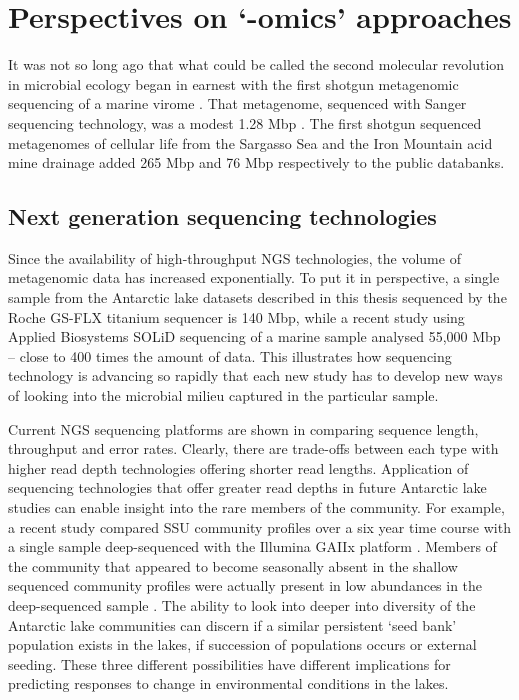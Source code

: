\section{Perspectives on `-omics' approaches }
It was not so long ago that what could be called the second molecular revolution in microbial ecology began in earnest with the first shotgun metagenomic sequencing of a marine virome \cite{Breitbart2002}.
That metagenome, sequenced with Sanger sequencing technology, was a modest 1.28 Mbp \cite{Breitbart2002}.
The first shotgun sequenced metagenomes of cellular life from the Sargasso Sea \cite{Venter2004} and the Iron Mountain acid mine drainage \cite{Tyson2004} added 265 Mbp and 76 Mbp respectively to the public databanks.

\subsection{Next generation sequencing technologies}
Since the availability of high-throughput \ac{NGS} technologies, the volume of metagenomic data has increased exponentially.
To put it in perspective, a single sample from the Antarctic lake datasets described in this thesis sequenced by the Roche GS-FLX titanium sequencer is 140 Mbp, while a recent study using Applied Biosystems SOLiD sequencing of a marine sample \cite{Iverson2012} analysed 55,000 Mbp -- close to 400 times the amount of data.
This illustrates how sequencing technology is advancing so rapidly that each new study has to develop new ways of looking into the microbial milieu captured in the particular sample.

Current \ac{NGS} sequencing platforms are shown in  comparing sequence length, throughput and error rates.
Clearly, there are trade-offs between each type with higher read depth technologies offering shorter read lengths. 
Application of sequencing technologies that offer greater read depths in future Antarctic lake studies can enable insight into the rare members of the community.
For example, a recent study compared \acs{SSU} community profiles over a six year time course with a single sample deep-sequenced with the Illumina GAIIx platform \cite{Caporaso2012}.
Members of the community that appeared to become seasonally absent in the shallow sequenced community profiles were actually present in low abundances in the deep-sequenced sample \cite{Caporaso2012}.
The ability to look into deeper into diversity of the Antarctic lake communities can discern if a similar persistent `seed bank' population exists in the lakes, if succession of populations occurs or external seeding.
These three different possibilities have different implications for predicting responses to change in environmental conditions in the lakes.


